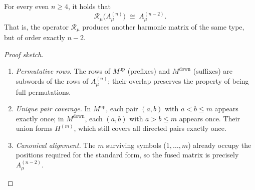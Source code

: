 \documentclass[10pt,a4paper]{amsart}
\begin{document}
\begin{theorem}\label{thm:mu-nesting}
For every even \(n \ge 4\), it holds that
\[
\mathcal{R}_\mu\!\bigl(A_\mu^{(n)}\bigr)\;\cong\;A_\mu^{(n-2)}.
\]
That is, the operator \(\mathcal{R}_\mu\) produces another harmonic matrix of the same type, but of order exactly \(n - 2\).
\end{theorem}

\begin{proof}[Proof sketch]\leavevmode
\begin{enumerate}
  \item \textit{Permutative rows.}\;
        The rows of \(M^{\text{up}}\) (prefixes) and \(M^{\text{down}}\) (suffixes)
        are subwords of the rows of \(A_\mu^{(n)}\); their overlap preserves
        the property of being full permutations.
  \item \textit{Unique pair coverage.}\;
        In \(M^{\text{up}}\), each pair \((a, b)\) with \(a < b \le m\) appears exactly once; in \(M^{\text{down}}\), each \((a, b)\) with \(a > b \le m\) appears once. Their union forms \(H^{(m)}\), which still covers all directed pairs exactly once.
  \item \textit{Canonical alignment.}\;
        The \(m\) surviving symbols (\(1, \dots, m\)) already occupy
        the positions required for the standard form,
        so the fused matrix is precisely
        \(A_\mu^{(n-2)}\).
\end{enumerate}
\end{proof}
\end{document}
